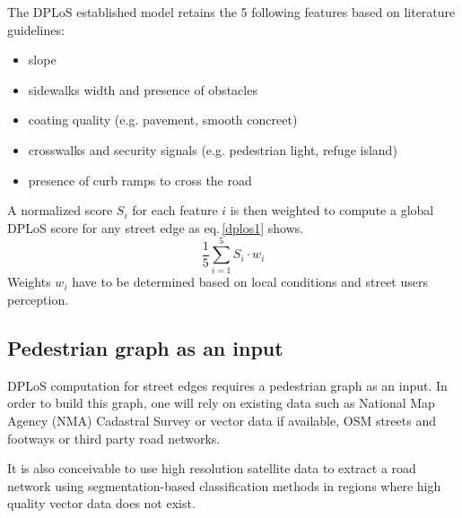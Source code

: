 \documentclass[10pt,conference,a4paper]{IEEEtran}
\begin{document}
The DPLoS established model retains the 5 following features based on literature guidelines: %
\begin{itemize}
\item slope
\item sidewalks width and presence of obstacles
\item coating quality (e.g. pavement, smooth concreet)
\item crosswalks and security signals (e.g. pedestrian light, refuge island)
\item presence of curb ramps to cross the road
\end{itemize}

A normalized score $S_{i}$ for each feature $i$ is then weighted to compute a global DPLoS score for any street edge as eq.\,\ref{dplos1} shows.
\begin{equation}
\frac{1}{5}\sum\limits_{i=1}^5 S_{i}\cdot{}w_{i}
\label{dplos1}
\end{equation}
Weights $w_{i}$ have to be determined based on local conditions and street users perception.
\subsection{Pedestrian graph as an input}
DPLoS computation for street edges requires a pedestrian graph as an input.
In order to build this graph, one will rely on existing data such as National Map Agency (NMA) Cadastral Survey or vector data if available, OSM streets and footways or third party road networks.

It is also conceivable to use high resolution satellite %
data to extract a road network using segmentation-based classification methods
in regions where high quality vector data does not exist. 
\end{document}
